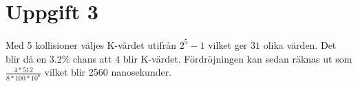 \section{Uppgift 3}
\paragraph{}
Med 5 kollisioner väljes K-värdet utifrån $2^5-1$ vilket ger $31$ olika värden. Det blir då en 3.2\% chans att 4 blir K-värdet. Fördröjningen kan sedan räknas ut som $\frac{4*512}{8*100*10^6}$ vilket blir 2560 nanosekunder.
